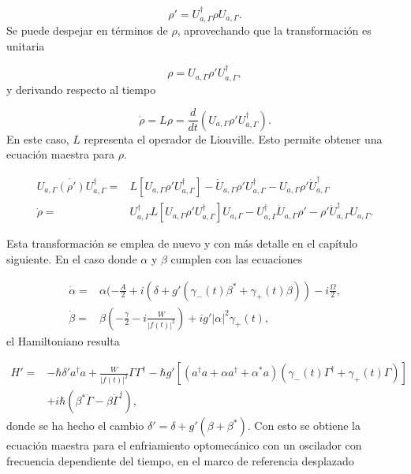 \documentclass[10pt,a4paper]{report}
\begin{document}
\begin{equation}
\rho' = U_{a,\Gamma}^\dagger \rho U_{a,\Gamma}.
\end{equation} Se puede despejar en términos de $\rho$, aprovechando que la transformación es unitaria

\begin{equation}
\rho = U_{a,\Gamma} \rho' U_{a,\Gamma}^\dagger,
\end{equation} y derivando respecto al tiempo

\begin{equation}
\dot{\rho} = L\rho = \frac{d}{dt}(U_{a,\Gamma} \rho' U_{a,\Gamma}^\dagger).
\end{equation} En este caso, $L$ representa el operador de Liouville. Esto permite obtener una ecuación maestra para $\rho$. 

\begin{align}
 U_{a,\Gamma} \dot{(\rho')} U_{a,\Gamma}^\dagger =& L[U_{a,\Gamma} \rho' U_{a,\Gamma}^\dagger] - \dot{U}_{a,\Gamma}\rho'U_{a,\Gamma}^\dagger -U_{a,\Gamma} \rho' \dot{U}_{a,\Gamma}^\dagger\\
\dot{\rho} =& U_{a,\Gamma}^\dagger L[U_{a,\Gamma} \rho' U_{a,\Gamma}^\dagger]U_{a,\Gamma}-U_{a,\Gamma}^\dagger\dot{U}_{a,\Gamma}\rho'-\rho'\dot{U}_{a,\Gamma}^\dagger U_{a,\Gamma}.
\end{align}

Esta transformación se emplea de nuevo y con más detalle en el capítulo siguiente. En el caso donde $\alpha$ y $\beta$ cumplen con las ecuaciones

\begin{align}
\dot{\alpha} =& \alpha(-\frac{A}{2}+i(\delta+g'(\gamma_-(t) \beta^* + \gamma_+(t) \beta))-i\frac{\Omega}{2},\\
\dot{\beta} =& \beta(-\frac{\gamma}{2}-i\frac{W}{|f(t)|^2})+ig'|\alpha|^2\gamma_+(t),
\end{align} el Hamiltoniano resulta


\begin{align*}
H'=& -\hbar \delta' a^\dagger a + \frac{W}{|f(t)|^2}\Gamma \Gamma^\dagger -\hbar g'[(a^{\dagger}a +\alpha a^{\dagger}+\alpha^* a)(\gamma_-(t)\Gamma^{\dagger}+\gamma_+(t)\Gamma)]\\
&+ i\hbar(\beta^*\dot{\Gamma} - \beta \dot{\Gamma}^\dagger),
\end{align*}  donde se ha hecho el cambio $\delta' = \delta + g'(\beta + \beta^*)$. Con esto se obtiene la ecuación maestra para el enfriamiento optomecánico con un oscilador con frecuencia dependiente del tiempo, en el marco de referencia desplazado
\end{document}
